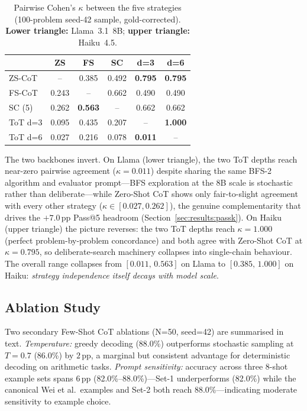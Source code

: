 \documentclass[conference]{IEEEtran}
\begin{document}
\begin{table}[t]
\centering
\caption{Pairwise Cohen's $\kappa$ between the five strategies
(100-problem seed-42 sample, gold-corrected).
\textbf{Lower triangle:} Llama~3.1~8B; \textbf{upper triangle:}
Haiku~4.5.}
\label{tab:kappa}
\setlength{\tabcolsep}{4pt}
\begin{tabular}{@{}lccccc@{}}
\toprule
& \textbf{ZS} & \textbf{FS} & \textbf{SC} & \textbf{d=3} & \textbf{d=6} \\
\midrule
ZS-CoT  & --     & 0.385 & 0.492 & \textbf{0.795} & \textbf{0.795} \\
FS-CoT  & 0.243  & --    & 0.662 & 0.490 & 0.490 \\
SC (5)  & 0.262  & \textbf{0.563} & --    & 0.662 & 0.662 \\
ToT d=3 & 0.095  & 0.435 & 0.207 & --    & \textbf{1.000} \\
ToT d=6 & 0.027  & 0.216 & 0.078 & \textbf{0.011} & --    \\
\bottomrule
\end{tabular}
\end{table}

The two backbones invert.
On Llama (lower triangle), the two ToT depths reach near-zero pairwise
agreement ($\kappa=0.011$) despite sharing the same BFS-2 algorithm and
evaluator prompt---BFS exploration at the 8B scale is stochastic rather
than deliberate---while Zero-Shot CoT shows only fair-to-slight
agreement with every other strategy ($\kappa \in [0.027, 0.262]$), the
genuine complementarity that drives the $+7.0$\,pp Pass@5 headroom
(Section~\ref{sec:results:passk}).
On Haiku (upper triangle) the picture reverses: the two ToT depths
reach $\kappa=1.000$ (perfect problem-by-problem concordance) and both
agree with Zero-Shot CoT at $\kappa=0.795$, so deliberate-search
machinery collapses into single-chain behaviour.
The overall range collapses from $[0.011,\,0.563]$ on Llama to
$[0.385,\,1.000]$ on Haiku: \emph{strategy independence itself decays
with model scale}.

\subsection{Ablation Study}
Two secondary Few-Shot CoT ablations (N=50, seed=42) are summarised in
text.
\emph{Temperature:} greedy decoding (88.0\%) outperforms stochastic
sampling at $T{=}0.7$ (86.0\%) by $2$\,pp, a marginal but consistent
advantage for deterministic decoding on arithmetic tasks.
\emph{Prompt sensitivity:} accuracy across three 8-shot example sets
spans $6$\,pp (82.0\%--88.0\%)---Set-1 underperforms (82.0\%) while the
canonical Wei et al.\ examples and Set-2 both reach 88.0\%---indicating
moderate sensitivity to example choice.
\end{document}
